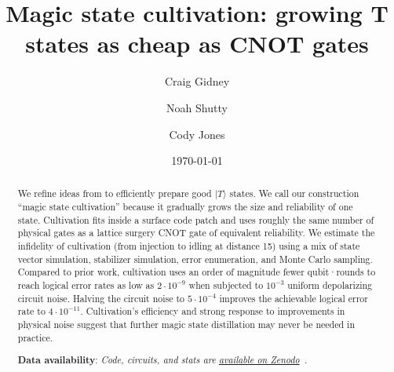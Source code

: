 \documentclass[onecolumn,unpublished,a4paper]{quantumarticle}
\theoremstyle{definition}
\begin{document}
\title{Magic state cultivation: growing T states as cheap as CNOT gates}

\date{\today}
\author{Craig Gidney}

\author{Noah Shutty}

\author{Cody Jones}


\begin{abstract}
We refine ideas from \cite{knill1996threshold,jones2016colorcode,chamberland2020colorinjection,bombin2024gap,gidney2023colorcode,gidney2024yoked,hirano2024zeroleveldistill} to efficiently prepare good $|T\rangle$ states.
We call our construction ``magic state cultivation'' because it gradually grows the size and reliability of one state.
Cultivation fits inside a surface code patch and uses roughly the same number of physical gates as a lattice surgery CNOT gate of equivalent reliability.
We estimate the infidelity of cultivation (from injection to idling at distance 15) using a mix of state vector simulation, stabilizer simulation, error enumeration, and Monte Carlo sampling.
Compared to prior work, cultivation uses an order of magnitude fewer qubit·rounds to reach logical error rates as low as $2 \cdot 10^{-9}$ when subjected to $10^{-3}$ uniform depolarizing circuit noise.
Halving the circuit noise to $5 \cdot 10^{-4}$ improves the achievable logical error rate to $4 \cdot 10^{-11}$.
Cultivation's efficiency and strong response to improvements in physical noise suggest that further magic state distillation may never be needed in practice.

\textbf{Data availability}: \emph{Code, circuits, and stats are \href{https://doi.org/10.5281/zenodo.13777072}{available on Zenodo}~\cite{gidneyy2024cultivationdata}.}
\end{abstract}


{
  \hypersetup{linkcolor=blue}
  \tableofcontents
}
\end{document}
